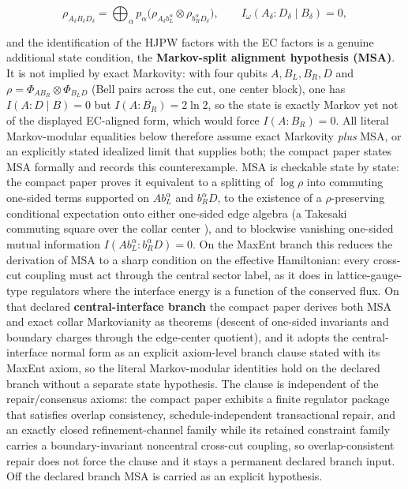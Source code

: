 \[
\rho_{A_\delta B_\delta D_\delta}
= \bigoplus_\alpha p_\alpha
\bigl(\rho_{A_\delta b_L^\alpha} \otimes \rho_{b_R^\alpha D_\delta}\bigr),
\qquad
I_\omega(A_\delta:D_\delta \mid B_\delta)=0,
\]

and the identification of the HJPW factors with the EC factors is a genuine additional state condition, the \textbf{Markov-split alignment hypothesis (MSA)}. It is not implied by exact Markovity: with four qubits \(A,B_L,B_R,D\) and \(\rho=\Phi_{AB_R}\otimes\Phi_{B_LD}\) (Bell pairs across the cut, one center block), one has \(I(A:D\mid B)=0\) but \(I(A:B_R)=2\ln 2\), so the state is exactly Markov yet not of the displayed EC-aligned form, which would force \(I(A:B_R)=0\). All literal Markov-modular equalities below therefore assume exact Markovity \emph{plus} MSA, or an explicitly stated idealized limit that supplies both; the compact paper states MSA formally and records this counterexample. MSA is checkable state by state: the compact paper proves it equivalent to a splitting of \(\log\rho\) into commuting one-sided terms supported on \(A b_L^\alpha\) and \(b_R^\alpha D\), to the existence of a \(\rho\)-preserving conditional expectation onto either one-sided edge algebra (a Takesaki commuting square over the collar center \cite{takesaki72}), and to blockwise vanishing one-sided mutual information \(I(Ab_L^\alpha:b_R^\alpha D)=0\). On the MaxEnt branch this reduces the derivation of MSA to a sharp condition on the effective Hamiltonian: every cross-cut coupling must act through the central sector label, as it does in lattice-gauge-type regulators where the interface energy is a function of the conserved flux. On that declared \textbf{central-interface branch} the compact paper derives both MSA and exact collar Markovianity as theorems (descent of one-sided invariants and boundary charges through the edge-center quotient), and it adopts the central-interface normal form as an explicit axiom-level branch clause stated with its MaxEnt axiom, so the literal Markov-modular identities hold on the declared branch without a separate state hypothesis. The clause is independent of the repair/consensus axioms: the compact paper exhibits a finite regulator package that satisfies overlap consistency, schedule-independent transactional repair, and an exactly closed refinement-channel family while its retained constraint family carries a boundary-invariant noncentral cross-cut coupling, so overlap-consistent repair does not force the clause and it stays a permanent declared branch input. Off the declared branch MSA is carried as an explicit hypothesis.

